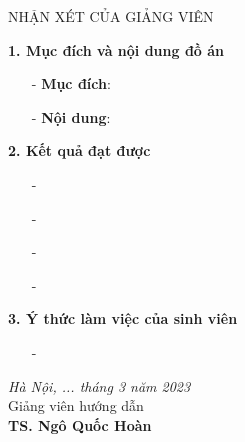 \newpage
\thispagestyle{empty}
\begin{center}
    NHẬN XÉT CỦA GIẢNG VIÊN
\end{center}
\textbf{1. Mục đích và nội dung đồ án}
\begin{itemize}
    \item[-] \textbf{Mục đích}: 
    \item[-] \textbf{Nội dung}: 
  
\end{itemize}
\textbf{2. Kết quả đạt được}
\begin{itemize}
    \item[-] 
    \item[-] 
    \item[-] 
    \item[-] 
    
\end{itemize}
\textbf{3. Ý thức làm việc của sinh viên}
\begin{itemize}
    \item[-] 
\end{itemize}
\vspace{.5cm}
\hspace{0.5\textwidth}
\begin{minipage}{0.5\textwidth}
	\noindent\begin{center}
		\textit{Hà Nội, ... tháng 3 năm 2023} \\
		Giảng viên hướng dẫn\\ \vspace{1.4cm}
		\textbf{TS. Ngô Quốc Hoàn} \\
	\end{center}	
\end{minipage}
